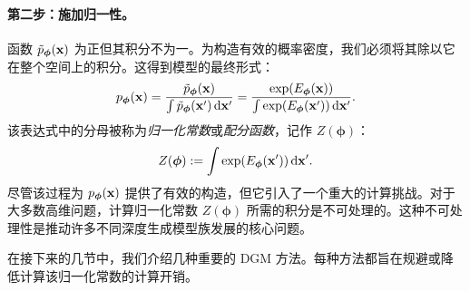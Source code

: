 \paragraph{第二步：施加归一性。}
函数 $\tilde{p}_{\bm{\phi}}({\mathbf{x}})$ 为正但其积分不为一。为构造有效的概率密度，我们必须将其除以它在整个空间上的积分。这得到模型的最终形式：
\[
p_{\bm{\phi}}({\mathbf{x}}) = \frac{\tilde{p}_{\bm{\phi}}({\mathbf{x}})}{\int \tilde{p}_{\bm{\phi}}({\mathbf{x}}') \mathop{}\!\mathrm{d} {\mathbf{x}}'} = \frac{\exp(E_{\bm{\phi}}({\mathbf{x}}))}{\int \exp(E_{\bm{\phi}}({\mathbf{x}}')) \mathop{}\!\mathrm{d} {\mathbf{x}}'}.
\]
该表达式中的分母被称为\emph{归一化常数}或\emph{配分函数}，记作 $Z(\bm{\phi})$：
\[
Z(\bm{\phi}) := \int \exp(E_{\bm{\phi}}({\mathbf{x}}')) \mathop{}\!\mathrm{d} {\mathbf{x}}'.
\]
尽管该过程为 $p_{\bm{\phi}}({\mathbf{x}})$ 提供了有效的构造，但它引入了一个重大的计算挑战。对于大多数高维问题，计算归一化常数 $Z(\bm{\phi})$ 所需的积分是不可处理的。这种不可处理性是推动许多不同深度生成模型族发展的核心问题。


在接下来的几节中，我们介绍几种重要的 DGM 方法。每种方法都旨在规避或降低计算该归一化常数的计算开销。
\newpage



